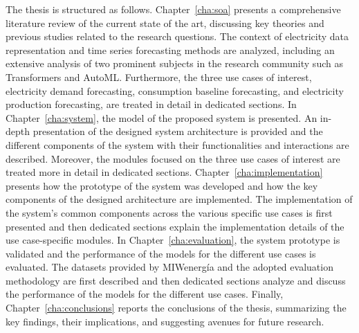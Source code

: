The thesis is structured as follows. 
Chapter~\ref{cha:soa} presents a comprehensive literature review of the current state of the art, discussing key theories and previous studies related to the research questions.
The context of electricity data representation and time series forecasting methods are analyzed, including an extensive analysis of two prominent subjects in the research community such as Transformers and AutoML.
Furthermore, the three use cases of interest, electricity demand forecasting, consumption baseline forecasting, and electricity production forecasting, are treated in detail in dedicated sections.
In Chapter~\ref{cha:system}, the model of the proposed system is presented.
An in-depth presentation of the designed system architecture is provided and the different components of the system with their functionalities and interactions are described.
Moreover, the modules focused on the three use cases of interest are treated more in detail in dedicated sections.
Chapter~\ref{cha:implementation} presents how the prototype of the system was developed and how the key components of the designed architecture are implemented.
The implementation of the system’s common components across the various specific use cases is first presented and then dedicated sections explain the implementation details of the use case-specific modules.
In Chapter~\ref{cha:evaluation}, the system prototype is validated and the performance of the models for the different use cases is evaluated.
The datasets provided by MIWenergía and the adopted evaluation methodology are first described and then dedicated sections analyze and discuss the performance of the models for the different use cases.
Finally, Chapter~\ref{cha:conclusions} reports the conclusions of the thesis, summarizing the key findings, their implications, and suggesting avenues for future research.
